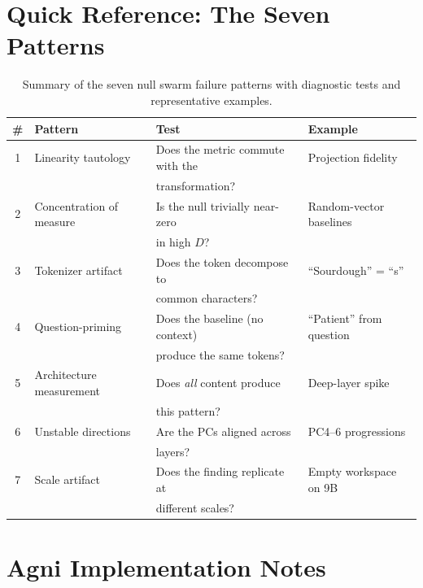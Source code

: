 \documentclass[11pt,a4paper]{article}
\begin{document}
\section{Quick Reference: The Seven Patterns}
\label{app:patterns}

\begin{table}[H]
\centering
\caption{Summary of the seven null swarm failure patterns with
diagnostic tests and representative examples.}
\label{tab:patterns}
\begin{tabular}{clll}
\toprule
\# & Pattern & Test & Example \\
\midrule
1 & Linearity tautology & Does the metric commute with the & Projection fidelity \\
  &                     & transformation? & \\
2 & Concentration of measure & Is the null trivially near-zero & Random-vector baselines \\
  &                          & in high $D$? & \\
3 & Tokenizer artifact & Does the token decompose to & ``Sourdough'' = ``s'' \\
  &                    & common characters? & \\
4 & Question-priming & Does the baseline (no context) & ``Patient'' from question \\
  &                  & produce the same tokens? & \\
5 & Architecture measurement & Does \emph{all} content produce & Deep-layer spike \\
  &                          & this pattern? & \\
6 & Unstable directions & Are the PCs aligned across & PC4--6 progressions \\
  &                     & layers? & \\
7 & Scale artifact & Does the finding replicate at & Empty workspace on 9B \\
  &                & different scales? & \\
\bottomrule
\end{tabular}
\end{table}

\section{Agni Implementation Notes}
\label{app:agni}
\end{document}
